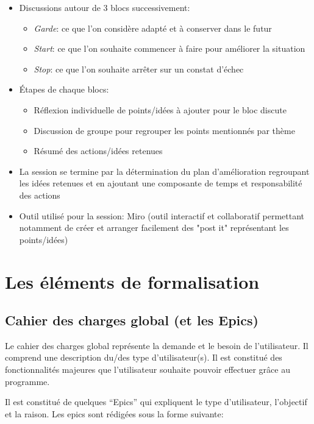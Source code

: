 \begin{itemize}
      \item Discussions autour de 3 blocs successivement:
      \begin{itemize}
            \item \emph{Garde}: ce que l’on considère adapté et à conserver dans le futur
            \item \emph{Start}: ce que l’on souhaite commencer à faire pour améliorer la situation
            \item \emph{Stop}: ce que l’on souhaite arrêter sur un constat d'échec
      \end{itemize}
      \item Étapes de chaque blocs:
      \begin{itemize}
            \item Réflexion individuelle de points/idées à ajouter pour le bloc discute
            \item Discussion de groupe pour regrouper les points mentionnés par thème
            \item Résumé des actions/idées retenues
      \end{itemize}
      \item La session se termine par la détermination du plan d'amélioration regroupant les 
      idées retenues et en ajoutant une composante de temps et responsabilité des actions
      \item Outil utilisé pour la session: Miro (outil interactif et collaboratif permettant 
      notamment de créer et arranger facilement des "post it" représentant les points/idées)
\end{itemize}

\section{Les éléments de formalisation}

\subsection{Cahier des charges global (et les Epics)}
Le cahier des charges global représente la demande et le besoin de l’utilisateur. 
Il comprend une description du/des type d’utilisateur(s). Il est constitué des fonctionnalités majeures 
que l’utilisateur souhaite pouvoir effectuer grâce au programme. 

Il est constitué de quelques “Epics” qui expliquent le type d’utilisateur, l’objectif et la raison. 
Les epics sont rédigées sous la forme suivante:

